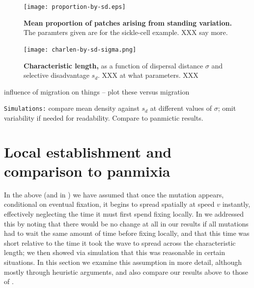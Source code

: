 \documentclass{article}
\begin{document}
\begin{figure}[ht]
\begin{center}
\texttt{[image: proportion-by-sd.eps]}
\caption{ %
{\bf Mean proportion of patches arising from standing variation.} The paramters given are for the sickle-cell example.  XXX say more.
}
\end{center}
\end{figure}

\begin{figure}[ht]
\begin{center}
\texttt{[image: charlen-by-sd-sigma.png]}
\caption{ %
{\bf Characteristic length,} as a function of dispersal distance $\sigma$ and selective disadvantage $s_d$.  XXX at what parameters. XXX
}
\end{center}
\end{figure}


influence of migration on things -- plot these versus migration 

{\tt Simulations:} compare mean density against $s_d$ at different values of $\sigma$; omit variability if needed for readability.
Compare to panmictic results.


\section{Local establishment and comparison to panmixia}

In the above (and in \citet{ralphcoop2010}) we have assumed that once the mutation appears,
conditional on eventual fixation, it begins to spread spatially at speed $v$ instantly,
effectively neglecting the time it must first spend fixing locally.
In \citet{ralphcoop2010} we addressed this by noting that there would be no change at all in our results 
if all mutations had to wait the same amount of time before fixing locally,
and that this time was short relative to the time it took the wave to spread across the characteristic length;
we then showed via simulation that this was reasonable in certain situations.
In this section we examine this assumption in more detail, although mostly through heuristic arguments,
and also compare our results above to those of \citet{softsweeps}.
\end{document}
